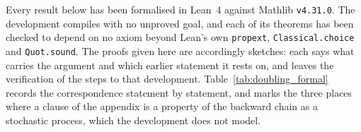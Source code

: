 Every result below has been formalised in Lean~4 against Mathlib \texttt{v4.31.0}. The
development compiles with no unproved goal, and each of its theorems has been checked to
depend on no axiom beyond Lean's own \texttt{propext}, \texttt{Classical.choice} and
\texttt{Quot.sound}. The proofs given here are accordingly sketches: each says what carries
the argument and which earlier statement it rests on, and leaves the verification of the
steps to that development. Table~\ref{tab:doubling_formal} records the correspondence
statement by statement, and marks the three places where a clause of the appendix is a
property of the backward chain as a stochastic process, which the development does not
model.
